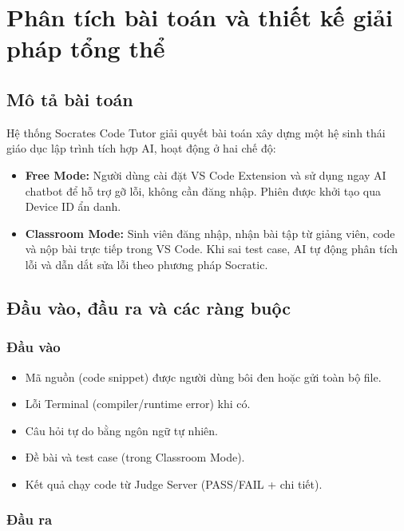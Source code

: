 \chapter{Phân tích bài toán và thiết kế giải pháp tổng thể}
\label{chap:design}

\section{Mô tả bài toán}

Hệ thống Socrates Code Tutor giải quyết bài toán xây dựng một hệ sinh thái giáo dục lập trình tích hợp AI, hoạt động ở hai chế độ:

\begin{itemize}
    \item \textbf{Free Mode:} Người dùng cài đặt VS Code Extension và sử dụng ngay AI chatbot để hỗ trợ gỡ lỗi, không cần đăng nhập. Phiên được khởi tạo qua Device ID ẩn danh.
    \item \textbf{Classroom Mode:} Sinh viên đăng nhập, nhận bài tập từ giảng viên, code và nộp bài trực tiếp trong VS Code. Khi sai test case, AI tự động phân tích lỗi và dẫn dắt sửa lỗi theo phương pháp Socratic.
\end{itemize}

\section{Đầu vào, đầu ra và các ràng buộc}

\subsection{Đầu vào}

\begin{itemize}
    \item Mã nguồn (code snippet) được người dùng bôi đen hoặc gửi toàn bộ file.
    \item Lỗi Terminal (compiler/runtime error) khi có.
    \item Câu hỏi tự do bằng ngôn ngữ tự nhiên.
    \item Đề bài và test case (trong Classroom Mode).
    \item Kết quả chạy code từ Judge Server (PASS/FAIL + chi tiết).
\end{itemize}

\subsection{Đầu ra}

